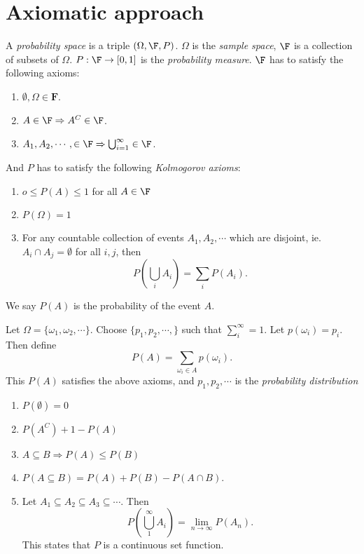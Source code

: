 \documentclass[a4paper]{article}
\begin{document}
\section{Axiomatic approach}
\begin{defi}
  A \emph{probability space} is a triple $(\Omega, \F, P)$. $\Omega$ is the \emph{sample space}, $\F$ is a collection of subsets of $\Omega$. $P: \F\to [0, 1]$ is the \emph{probability measure}. $\F$ has to satisfy the following axioms:
  \begin{enumerate}
    \item $\emptyset, \Omega\in \mathbf{F}$.
    \item $A\in \F \Rightarrow  A^C\in \F$.
    \item $A_1, A_2, \cdots, \in \F \Rightarrow \bigcup_{i = 1}^\infty \in \F$.
  \end{enumerate}
  And $P$ has to satisfy the following \emph{Kolmogorov axioms}:
  \begin{enumerate}
    \item $o \leq P(A) \leq 1 $ for all $A\in \F$
    \item $P(\Omega) = 1$
    \item For any countable collection of events $A_1, A_2, \cdots$ which are disjoint, ie. $A_i\cap A_j = \emptyset$ for all $i, j$, then
      \[
        P\left(\bigcup_i A_i\right) = \sum_i P(A_i).
      \]
  \end{enumerate}
  We say $P(A)$ is the probability of the event $A$.
\end{defi}

\begin{defi}
  Let $\Omega = \{\omega_1, \omega_2, \cdots\}$. Choose $\{p_1, p_2, \cdots, \}$ such that $\sum_{i}^\infty = 1$. Let $p(\omega_i) = p_i$. Then define
  \[
    P(A) = \sum_{\omega_i\in A} p(\omega_i).
  \]
  This $P(A)$ satisfies the above axioms, and $p_1, p_2, \cdots$ is the \emph{probability distribution}
\end{defi}

\begin{thm}\leavevmode
  \begin{enumerate}
    \item $P(\emptyset) = 0$
    \item $P(A^C) + 1 - P(A)$
    \item $A\subseteq B \Rightarrow P(A) \leq P(B)$
    \item $P (A\subseteq B) = P(A) + P(B) - P(A\cap B)$.
    \item Let $A_1\subseteq A_2\subseteq A_3\subseteq \cdots$. Then
      \[
        P\left(\bigcup_1^\infty A_i\right) = \lim_{n\to \infty} P(A_n).
      \]
      This states that $P$ is a continuous set function.
  \end{enumerate}
\end{thm}
\end{document}
